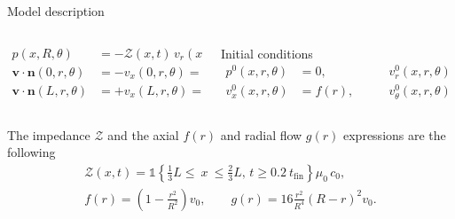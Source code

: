 \documentclass[aspectratio=169]{ISAE-Beamer}
\begin{document}
\begin{frame}{Model description}
\begin{overlayarea}{\textwidth}{\textheight}
{\begin{columns}[T]
\begin{column}{.45\textwidth}
\begin{align*}
	p(x, R, \theta) &= - \mathcal{Z}(x, t) \, v_r(x, R, \theta), \\
	\bm{v} \cdot \bm{n}(0, r, \theta) &= -v_x(0, r, \theta) = - f(r), \\
	\bm{v} \cdot \bm{n}(L, r, \theta) &= +v_x(L, r, \theta) = + f(r), 
	\end{align*}
\end{column}
\begin{column}{.45\textwidth}
	Initial conditions
	\begin{equation*}
	\begin{aligned}
	p^0(x, r, \theta) &= 0, \\
	v_x^0(x, r, \theta) &= f(r), 
	\end{aligned}  \qquad
	\begin{aligned}
	v_r^0(x, r, \theta) &= g(r), \\
	v_\theta^0(x, r, \theta) &= 0.
	\end{aligned}    
	\end{equation*}
\end{column}
\end{columns}
\vspace{5pt}
The impedance $\mathcal{Z}$ and the axial $f(r)$ and radial flow $g(r)$ expressions are the following
\begin{equation*}
\begin{aligned}
\mathcal{Z}(x, t) = \mathds{1}\left\{ \frac{1}{3} L \leq \ x \ \leq \frac{2}{3} L, \,  t \geq 0.2 \ t_{\text{fin}} \right\} \mu_0 \, c_0, \\
f(r) = \left( 1 - \frac{r^2}{R^2} \right) v_0, \qquad
g(r) = 16 \frac{r^2}{R^4} \left( R - r \right)^2 v_0. 
\end{aligned}
\end{equation*}
}
\end{overlayarea}
\end{frame}
\end{document}
